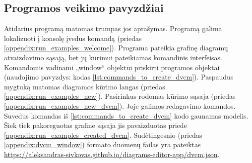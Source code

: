 \subsection{Programos veikimo pavyzdžiai}


Atidarius programą matomas trumpas jos aprašymas. Programą galima lokalizuoti į konsolę įvedus komandą  (priedas \ref{appendix:run_examples_welcome}). Programa pateikia grafinę diagramų atvaizdavimo sąsają, bet jų kūrimui pateikiamas komandinis interfeisas. Komandomis vadinami „window“ objektui priskirti programos objektai (naudojimo pavyzdys: kodas \ref{lst:commands_to_create_dvcm}). Paspaudus mygtuką  matomas diagramos kūrimo langas (priedas \ref{appendix:run_examples_new}). Pasirinkus \uiWord{\DVCM{}} rodomas \DVCM{} kūrimo sąsaja (priedas \ref{appendix:run_examples_new_dvcm}). Joje galimos \DVCM{} redagavimo komandos. Suvedus komandas iš \ref{lst:commands_to_create_dvcm} kodo gaunamas \DVCM{} modelis. Šiek tiek pakoreguotas grafine sąsaja jis pavaizduotas priede \ref{appendix:run_examples_created_dvcm}. Sudėtingesnio \DVCM{} (priedas \ref{appendix:dvcm_window}) \JSON{} formato duomenų failas yra pateiktas \href{https://aleksandras-sivkovas.github.io/diagrams-editor-app/dvcm.json}{https://aleksandras-sivkovas.github.io/diagrams-editor-app/dvcm.json}.

\renewcommand{\lstlistingname}{Kodas}
\renewcommand{\lstlistlistingname}{Kodo fragmentai}
\setcounter{lstlisting}{0}

